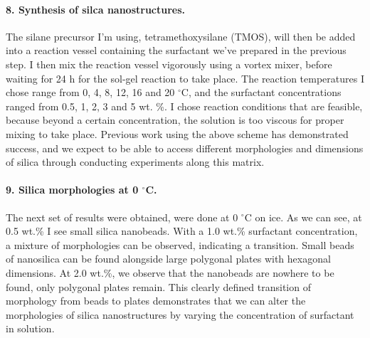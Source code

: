 \documentclass[a4paper,12pt]{article}
\begin{document}
\paragraph{8. Synthesis of silca nanostructures.}The silane precursor I'm using, tetramethoxysilane (TMOS), will then be added into a reaction vessel containing the surfactant we've prepared in the previous step. I then mix the reaction vessel vigorously using a vortex mixer, before waiting for 24 h for the sol-gel reaction to take place.
\bigbreak
The reaction temperatures I chose range from 0, 4, 8, 12, 16 and 20 $^\circ$C, and the surfactant concentrations ranged from 0.5, 1, 2, 3 and 5 wt. \%. I chose reaction conditions that are feasible, because beyond a certain concentration, the solution is too viscous for proper mixing to take place. 
\bigbreak
Previous work using the above scheme has demonstrated success, and we expect to be able to access different morphologies and dimensions of silica through conducting experiments along this matrix.


\paragraph{9. Silica morphologies at 0 $^\circ$C.}The next set of results were obtained, were done at 0 $^\circ$C on ice. 
\bigbreak
As we can see, at 0.5 wt.\% I see small silica nanobeads. With a 1.0 wt.\% surfactant concentration, a mixture of morphologies can be observed, indicating a transition. Small beads of nanosilica can be found alongside large polygonal plates with hexagonal dimensions.
\bigbreak
At 2.0 wt.\%, we observe that the nanobeads are nowhere to be found, only polygonal plates remain.
\bigbreak
This clearly defined transition of morphology from beads to plates demonstrates that we can alter the morphologies of silica nanostructures by varying the concentration of surfactant in solution.
\end{document}

